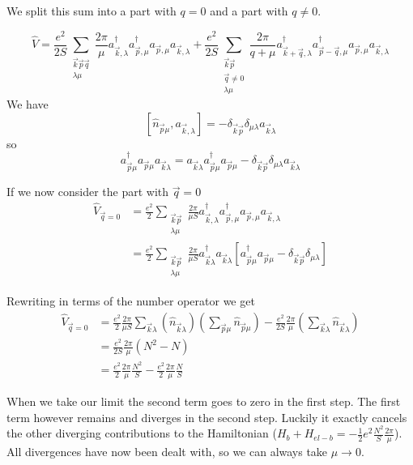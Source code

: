 We split this sum into a part with $q=0$ and a part with $q \neq 0$.

\[ \hat{V} = \frac{e^2}{2S}\sum_{\substack{\vec{k}\vec{p}\vec{q} \\ \lambda \mu}}\frac{2\pi}{\mu}a_{\vec{k},\lambda}^\dagger a_{\vec{p},\mu}^\dagger a_{\vec{p},\mu} a_{\vec{k},\lambda} + \frac{e^2}{2S}\sum_{\substack{\vec{k}\vec{p} \\ \vec{q}\neq 0 \\ \lambda \mu}}\frac{2\pi}{q+\mu}a_{\vec{k}+ \vec{q},\lambda}^\dagger a_{\vec{p}- \vec{q},\mu}^\dagger a_{\vec{p},\mu} a_{\vec{k},\lambda} \]
We have
\[ \left[\hat{n}_{\vec{p}\mu}, a_{\vec{k},\lambda}\right] = - \delta_{\vec{k}\vec{p}}\delta_{\mu\lambda}a_{\vec{k}\lambda} \]
so
\[ a^\dagger_{\vec{p}\mu}a_{\vec{p}\mu}a_{\vec{k}\lambda} = a_{\vec{k}\lambda}a^\dagger_{\vec{p}\mu}a_{\vec{p}\mu} - \delta_{\vec{k}\vec{p}}\delta_{\mu\lambda}a_{\vec{k}\lambda} \]


If we now consider the part with $\vec{q} = 0$
\begin{align*}
\hat{V}_{\vec{q}=0} &= \frac{e^2}{2}\sum_{\substack{\vec{k} \vec{p} \\ \lambda \mu}} \frac{2\pi}{\mu S} a_{\vec{k},\lambda}^\dagger a_{\vec{p},\mu}^\dagger a_{\vec{p},\mu} a_{\vec{k},\lambda} \\
&= \frac{e^2}{2}\sum_{\substack{\vec{k} \vec{p} \\ \lambda \mu}} \frac{2\pi}{\mu S} a^\dagger_{\vec{k}\lambda}a_{\vec{k}\lambda}\left[a^\dagger_{\vec{p}\mu}a_{\vec{p}\mu} - \delta_{\vec{k}\vec{p}}\delta_{\mu\lambda}\right]
\end{align*}

Rewriting in terms of the number operator we get
\begin{align*}
\hat{V}_{\vec{q}=0} &= \frac{e^2}{2} \frac{2\pi}{\mu S} \sum_{\vec{k} \lambda} \left(\hat{n}_{\vec{k}\lambda}\right)\left(\sum_{\vec{p} \mu}\hat{n}_{\vec{p}\mu}\right) - \frac{e^2}{2S}\frac{2\pi}{\mu} \left(\sum_{\vec{k}\lambda}\hat{n}_{\vec{k}\lambda}\right) \\
&= \frac{e^2}{2S}\frac{2\pi}{\mu}\left(N^2 - N\right) \\
&= \frac{e^2}{2}\frac{2\pi}{\mu}\frac{N^2}{S} - \frac{e^2}{2}\frac{2\pi}{\mu}\frac{N}{S}
\end{align*}

When we take our limit the second term goes to zero in the first step. The first term however remains and diverges in the second step. Luckily it exactly cancels the other diverging contributions to the Hamiltonian ($H_b + H_{el-b} = - \frac{1}{2}e^2 \frac{N^2}{S}\frac{2\pi}{\mu}$). All divergences have now been dealt with, so we can always take $\mu \to 0$.

